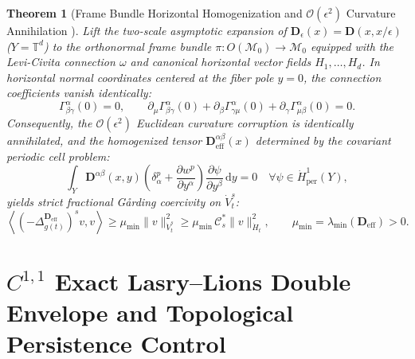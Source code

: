 \documentclass[11pt,a4paper,reqno]{article}
\theoremstyle{plain}
\newtheorem{theorem}{Theorem}[section]
\theoremstyle{definition}
\theoremstyle{remark}
\numberwithin{equation}{section}
\begin{document}
\begin{theorem}[Frame Bundle Horizontal Homogenization and $\mathcal{O}(\epsilon^2)$ Curvature Annihilation \cite{ananda2026stochastic_fluid_v2, hsu2002stochastic}]\label{thm:frame_bundle_homog}
Lift the two-scale asymptotic expansion of $\mathbf{D}_\epsilon(x) = \mathbf{D}(x, x/\epsilon)$ ($Y = \mathbb{T}^d$) to the orthonormal frame bundle $\pi : O(\mathcal{M}_0) \to \mathcal{M}_0$ equipped with the Levi-Civita connection $\omega$ and canonical horizontal vector fields $H_1, \dots, H_d$. In horizontal normal coordinates centered at the fiber pole $y = 0$, the connection coefficients vanish identically:
\begin{equation}\label{eq:christoffel_pole_zero}
  \Gamma_{\beta\gamma}^\alpha(0) = 0, \qquad \partial_\mu \Gamma_{\beta\gamma}^\alpha(0) + \partial_\beta \Gamma_{\gamma\mu}^\alpha(0) + \partial_\gamma \Gamma_{\mu\beta}^\alpha(0) = 0.
\end{equation}
Consequently, the $\mathcal{O}(\epsilon^2)$ Euclidean curvature corruption is identically annihilated, and the homogenized tensor $\mathbf{D}_{\mathrm{eff}}^{\alpha\beta}(x)$ determined by the covariant periodic cell problem:
\begin{equation}\label{eq:cell_problem}
  \int_{Y} \mathbf{D}^{\alpha\beta}(x, y) \left( \delta_\alpha^p + \frac{\partial w^p}{\partial y^\alpha} \right) \frac{\partial \psi}{\partial y^\beta} \,\mathrm{d}y = 0 \quad \forall \psi \in \dot{H}_{\mathrm{per}}^1(Y),
\end{equation}
yields strict fractional G\aa rding coercivity on $\dot{V}_t^s$:
\begin{equation}\label{eq:garding_coercivity}
  \left\langle (-\Delta_{g(t)}^{\mathbf{D}_{\mathrm{eff}}})^s v, v \right\rangle \ge \mu_{\min} \|v\|_{\dot{V}_t^s}^2 \ge \mu_{\min}\,\mathcal{C}_s^* \|v\|_{\dot{H}_t}^2, \qquad \mu_{\min} = \lambda_{\min}(\mathbf{D}_{\mathrm{eff}}) > 0.
\end{equation}
\end{theorem}

\section{\texorpdfstring{$C^{1,1}$}{C1,1} Exact Lasry--Lions Double Envelope and Topological Persistence Control}
\label{sec:lasry_lions}
\end{document}
